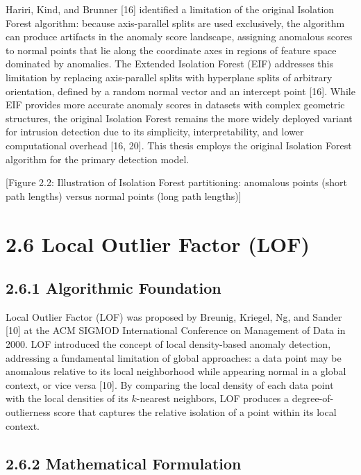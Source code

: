 \documentclass[
  a4paper]{report}
\begin{document}
Hariri, Kind, and Brunner {[}16{]} identified a limitation of the
original Isolation Forest algorithm: because axis-parallel splits are
used exclusively, the algorithm can produce artifacts in the anomaly
score landscape, assigning anomalous scores to normal points that lie
along the coordinate axes in regions of feature space dominated by
anomalies. The Extended Isolation Forest (EIF) addresses this limitation
by replacing axis-parallel splits with hyperplane splits of arbitrary
orientation, defined by a random normal vector and an intercept point
{[}16{]}. While EIF provides more accurate anomaly scores in datasets
with complex geometric structures, the original Isolation Forest remains
the more widely deployed variant for intrusion detection due to its
simplicity, interpretability, and lower computational overhead {[}16,
20{]}. This thesis employs the original Isolation Forest algorithm for
the primary detection model.

{[}Figure 2.2: Illustration of Isolation Forest partitioning: anomalous
points (short path lengths) versus normal points (long path lengths){]}

\section{2.6 Local Outlier Factor (LOF)}\label{local-outlier-factor-lof}

\subsection{2.6.1 Algorithmic
Foundation}\label{algorithmic-foundation-1}

Local Outlier Factor (LOF) was proposed by Breunig, Kriegel, Ng, and
Sander {[}10{]} at the ACM SIGMOD International Conference on Management
of Data in 2000. LOF introduced the concept of local density-based
anomaly detection, addressing a fundamental limitation of global
approaches: a data point may be anomalous relative to its local
neighborhood while appearing normal in a global context, or vice versa
{[}10{]}. By comparing the local density of each data point with the
local densities of its \(k\)-nearest neighbors, LOF produces a
degree-of-outlierness score that captures the relative isolation of a
point within its local context.

\subsection{2.6.2 Mathematical
Formulation}\label{mathematical-formulation}
\end{document}
